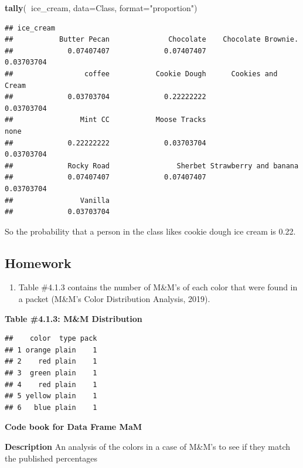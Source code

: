 \documentclass[]{book}
\newenvironment{Shaded}{\begin{snugshade}}{\end{snugshade}}
\newcommand{\DataTypeTok}[1]{\textcolor[rgb]{0.13,0.29,0.53}{#1}}
\newcommand{\KeywordTok}[1]{\textcolor[rgb]{0.13,0.29,0.53}{\textbf{#1}}}
\newcommand{\NormalTok}[1]{#1}
\newcommand{\OperatorTok}[1]{\textcolor[rgb]{0.81,0.36,0.00}{\textbf{#1}}}
\newcommand{\StringTok}[1]{\textcolor[rgb]{0.31,0.60,0.02}{#1}}
\providecommand{\tightlist}{%
  \setlength{\itemsep}{0pt}\setlength{\parskip}{0pt}}
\begin{document}
\begin{Shaded}
\begin{Highlighting}[]
\KeywordTok{tally}\NormalTok{(}\OperatorTok{~}\NormalTok{ice_cream, }\DataTypeTok{data=}\NormalTok{Class, }\DataTypeTok{format=}\StringTok{"proportion"}\NormalTok{)}
\end{Highlighting}
\end{Shaded}

\begin{verbatim}
## ice_cream
##           Butter Pecan              Chocolate    Chocolate Brownie.  
##             0.07407407             0.07407407             0.03703704 
##                 coffee           Cookie Dough      Cookies and Cream 
##             0.03703704             0.22222222             0.03703704 
##                Mint CC           Moose Tracks                   none 
##             0.22222222             0.03703704             0.03703704 
##             Rocky Road                Sherbet Strawberry and banana  
##             0.07407407             0.07407407             0.03703704 
##                Vanilla 
##             0.03703704
\end{verbatim}

So the probability that a person in the class likes cookie dough ice cream is 0.22.

\hypertarget{homework-10}{%
\subsection{Homework}\label{homework-10}}

\begin{enumerate}
\def\labelenumi{\arabic{enumi}.}
\tightlist
\item
  Table \#4.1.3 contains the number of M\&M's of each color that were
  found in a packet (M\&M's Color Distribution Analysis, 2019).
\end{enumerate}

\textbf{Table \#4.1.3: M\&M Distribution}

\begin{verbatim}
##    color  type pack
## 1 orange plain    1
## 2    red plain    1
## 3  green plain    1
## 4    red plain    1
## 5 yellow plain    1
## 6   blue plain    1
\end{verbatim}

\textbf{Code book for Data Frame MaM}

\textbf{Description}
An analysis of the colors in a case of M\&M's to see if they match the published percentages
\end{document}
